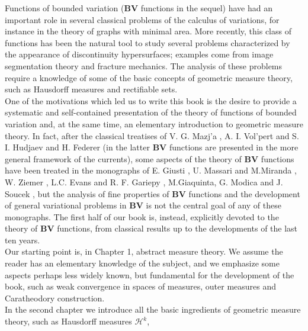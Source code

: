 %
%
\preface

Functions of bounded variation ($\mathbf{BV}$ functions in the sequel) have had an important role in several classical problems of the
calculus of variations, for instance in the theory of graphs with minimal area. More recently, this class of functions has been the natural
tool to study several problems characterized by the appearance of discontinuity hypersurfaces; examples come from image segmentation theory 
and fracture mechanics. The analysis of these problems require a knowledge of some of the basic concepts of geometric measure theory, such 
as Hausdorff measures and rectifiable sets.\\
One of the motivations which led us to write this book is the desire to provide a systematic and self-contained presentation of the theory 
of functions of bounded variation and, at the same time, an elementary introduction to geometric measure theory. In fact, after the classical 
treatises of V. G. Mazj'a \cite{Maz_ja_1985}, A. I. Vol'pert and S. I. Hudjaev \cite{Volpert1985AnalysisIC} and H. Federer \cite{Federer_1996} 
(in the latter $\mathbf{BV}$ functions are presented in the more general framework of the currents), some aspects of the theory of $\mathbf{BV}$ 
functions have been treated in the monographs of E. Giusti \cite{Giusti_1984}, U. Massari and M.Miranda \cite{208}, W. Ziemer \cite{278}, 
L.C. Evans and R. F. Gariepy \cite{145}, M.Giaquinta, G. Modica and J. Soucek \cite{173}, but the analysis of fine properties of $\mathbf{BV}$ 
functions and the development of general variational problems in $\mathbf{BV}$ is not the central goal of any of these monographs. The first 
half of our book is, instead, explicitly devoted to the theory of $\mathbf{BV}$ functions, from classical results up to the developments 
of the last ten years.\\
\indent Our starting point is, in Chapter 1, abstract measure theory. We assume the reader has an elementary knowledge of the subject, and 
we emphasize some aspects perhaps less widely known, but fundamental for the development of the book, such as weak convergence in spaces 
of measures, outer measures and Caratheodory construction.\\
In the second chapter we introduce all the basic ingredients of geometric measure theory, such as Hausdorff measures $\mathcal{H}^k$, 
